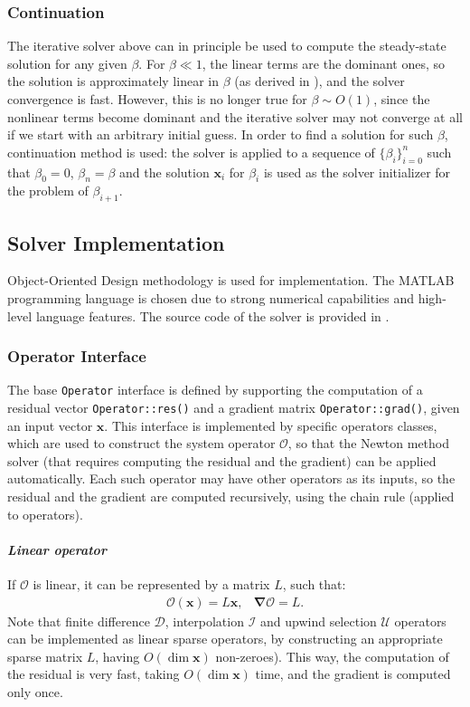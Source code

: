 \documentclass[10pt]{ijnam}
\newcommand\bnabla{\boldsymbol{\nabla}}
\newcommand\bx{\boldsymbol{x}}
\newcommand\cO{\mathcal{O}}
\newcommand\cI{\mathcal{I}}
\newcommand\cD{\mathcal{D}}
\begin{document}
\subsubsection{Continuation}

The iterative solver above can in principle be used 
to compute the steady-state solution for any given $\beta$.
For $\beta \ll 1$, the linear terms are the dominant ones, 
so the solution is approximately linear in $\beta$ 
(as derived in \cite{yariv2010migration}), and the solver convergence is fast.
However, this is no longer true for $\beta \sim O(1)$, since the nonlinear terms become dominant
and the iterative solver may not converge at all if we start with an arbitrary initial guess.
In order to find a solution for such $\beta$, continuation method is used:
the solver is applied to a sequence of $\{\beta_i\}_{i=0}^n$ such that $\beta_0 = 0$,
$\beta_n = \beta$ and the solution $\bx_i$ for $\beta_i$ is used as the solver initializer
for the problem of $\beta_{i+1}$.

\subsection{Solver Implementation}

Object-Oriented Design methodology is used for implementation.
The MATLAB programming language is chosen due to strong numerical capabilities
and high-level language features.
The source code of the solver is provided in \cite{source}.

\subsubsection{Operator Interface}
The base \verb|Operator| interface is defined by 
supporting the computation of a residual vector \verb|Operator::res()|
and a gradient matrix \verb|Operator::grad()|, given an input vector $\bx$.
This interface is implemented by specific operators classes,
which are used to construct the system operator $\cO$, so that 
the Newton method solver (that requires computing the residual and the gradient) 
can be applied automatically.
Each such operator may have other operators as its inputs, so the residual
and the gradient are computed recursively, using the chain rule (applied to operators).

\paragraph{\textit{Linear operator}}
If $\cO$ is linear, it can be represented by a matrix $L$, such that:
\begin{equation}\begin{array}{cc}
\cO(\bx) = L \bx, &
\bnabla\cO = L. 
\end{array}\end{equation}
Note that finite difference $\cD$, interpolation $\cI$ and 
upwind selection $\mathcal{U}$ operators
can be implemented as linear sparse operators, by constructing 
an appropriate sparse matrix $L$, having $O(\dim \bx)$ non-zeroes).
This way, the computation of the residual is very fast, taking $O(\dim \bx)$ time,
and the gradient is computed only once.
\end{document}
